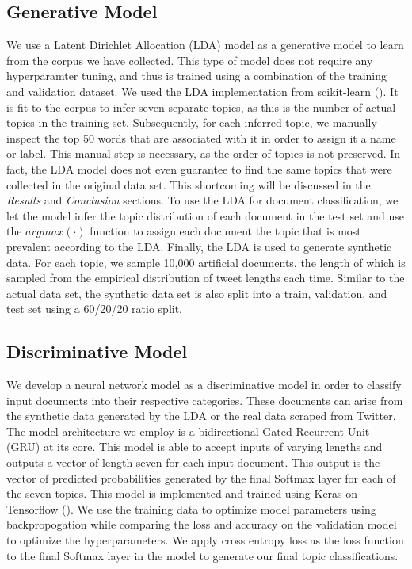 \documentclass[11pt]{article}
\begin{document}
\subsection{Generative Model}
We use a Latent Dirichlet Allocation (LDA) model as a generative model to learn from the corpus we have collected. This type of model does not require any hyperparamter tuning, and thus is trained using a combination of the training and validation dataset. We used the LDA implementation from scikit-learn (\cite{sklearn}). It is fit to the corpus to infer seven separate topics, as this is the number of actual topics in the training set. Subsequently, for each inferred topic, we manually inspect the top 50 words that are associated with it in order to assign it a name or label. This manual step is necessary, as the order of topics is not preserved. In fact, the LDA model does not even guarantee to find the same topics that were collected in the original data set. This shortcoming will be discussed in the \emph{Results} and \emph{Conclusion} sections. 
To use the LDA for document classification,  we let the model infer the topic distribution of each document in the test set and use the $argmax(\cdot)$ function to assign each document the topic that is most prevalent according to the LDA.
Finally, the LDA is used to generate synthetic data. For each topic, we sample 10,000 artificial documents, the length of which is sampled from the empirical distribution of tweet lengths each time. Similar to the actual data set, the synthetic data set is also split into a train, validation, and test set using a 60/20/20 ratio split.


\subsection{Discriminative Model}
We develop a neural network model as a discriminative model in order to classify input documents into their respective categories. These documents can arise from the synthetic data generated by the LDA or the real data scraped from Twitter. The model architecture we employ is a bidirectional Gated Recurrent Unit (GRU) at its core. This model is able to accept inputs of varying lengths and outputs a vector of length seven for each input document. This output is the vector of predicted probabilities generated by the final Softmax layer for each of the seven topics. This model is implemented and trained using Keras on Tensorflow (\cite{tensorflow}). We use the training data to optimize model parameters using backpropogation while comparing the loss and accuracy on the validation model to optimize the hyperparameters. We apply cross entropy loss as the loss function to the final Softmax layer in the model to generate our final topic classifications.
\end{document}
